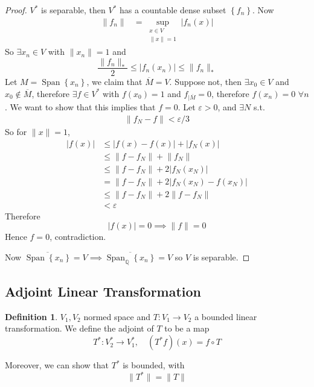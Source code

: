 \documentclass[11pt,a4paper]{article}
\theoremstyle{definition}
\newtheorem{definition}{Definition}[section]
\theoremstyle{plain}
\theoremstyle{remark}
\newcommand{\Q}{\mathbb{Q}}
\renewcommand{\set}[1]{\left\{ #1 \right\}}
\newcommand{\abs}[1]{\lvert #1 \rvert}
\newcommand{\norm}[1]{\lVert #1 \rVert}
\newcommand{\1}{\mathbbm{1}}
\newcommand{\Span}{\operatorname{Span}}
\begin{document}
\begin{proof}
    $V^*$ is separable, then $V^*$ has a countable dense subset $\set{f_n}$. Now 
    \begin{align*}
        \norm{f_n} &= \sup_{\substack{x \in V \\ \norm{x} = 1}} \abs{f_n (x)}
    \end{align*}
    So $\exists x_n \in V$ with $\norm{x_n} = 1$ and 
    $$\frac{\norm{f_n}_*}{2} \le \abs{f_n(x_n)} \le \norm{f_n}_*$$
    Let $M = \Span \set{x_n}$, we claim that $\overline{M} = V$. 
    Suppose not, then $\exists x_0 \in V$ and $x_0 \not\in \overline{M}$, therefore $\exists f \in V^*$ with $f(x_0) = 1$ and $f_{|\overline{M}} = 0$,
    therefore $f(x_n) = 0$ $\forall n$. We want to show that this implies that $f = 0$. Let $\varepsilon > 0$, and $\exists N$ s.t. 
    \begin{align*}
        \norm{f_N - f} < \varepsilon/3
    \end{align*}
    So for $\norm{x} = 1$, 
    \begin{align*}
        \abs{f(x)} &\le \abs{f(x) - f(x)} + \abs{f_N(x)} \\
        &\le \norm{f - f_N} + \norm{f_N} \\
        &\le \norm{f -f_N} + 2 \abs{f_N(x_N)} \\
        &= \norm{f -f_N} + 2 \abs{f_N(x_N) - f(x_N)} \\
        &\le \norm{f -f_N} + 2 \norm{f - f_N} \\
        &< \varepsilon
    \end{align*}
    Therefore 
    $$\abs{f(x)} = 0 \implies \norm{f} = 0$$
    Hence $f = 0$, contradiction.

    Now $\overline{\Span \set{x_n}} = V \implies \overline{\Span_\Q \set{x_n}} = V$ so $V$ is separable. 
\end{proof}

\subsection{Adjoint Linear Transformation} 

\begin{definition}
    $V_1, V_2$ normed space and $T \colon V_1 \to V_2$ a bounded linear transformation. We define the adjoint of $T$ to be a map 
    $$T^* \colon V_2^* \to V_1^*, \quad (T^* f)  (x) =  f \circ T$$ 

    Moreover, we can show that $T^*$ is bounded, with 
    $$\norm{T^*} = \norm{T}$$
\end{definition}
\end{document}
